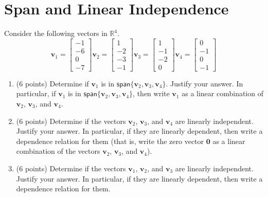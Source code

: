 \documentclass{article}
\theoremstyle{remark}
\newcommand{\vv}[1]{\mathbf{#1}}
\newcommand{\vspan}{\mathsf{span}}
\begin{document}
\section{Span and Linear Independence}
Consider the following vectors in $\mathbb R^4$.
\begin{displaymath}
  \mathbf v_1 =
  \begin{bmatrix}
    -1 \\
    -6 \\
    0 \\
    -7
  \end{bmatrix}
  \mathbf v_2 =
  \begin{bmatrix}
    1 \\
    -2 \\
    -3 \\
    -1
  \end{bmatrix}
  \mathbf v_3 =
  \begin{bmatrix}
    1 \\
    -1 \\
    -2 \\
    0
  \end{bmatrix}
  \mathbf v_4 =
  \begin{bmatrix}
    0 \\
    -1 \\
    0 \\
    -1
  \end{bmatrix}
\end{displaymath}
\begin{enumerate}
\item (6 points) Determine if $\vv v_1$ is in $\vspan\{\vv v_2, \vv v_3, \vv v_4\}$.
  Justify your answer.
  In particular, if $\vv v_1$ is in $\vspan\{\vv v_2, \vv v_3, \vv v_4\}$, then write $\vv v_1$ as a linear combination of $\vv v_2$, $\vv v_3$, and $\vv v_4$.
\item (6 points) Determine if the vectors $\vv v_2$, $\vv v_3$, and $\vv v_4$ are linearly independent.
  Justify your answer.
  In particular, if they are linearly dependent, then write a dependence relation for them (that is, write the zero vector $\vv 0$ as a linear combination of the vectors $\vv v_2$, $\vv v_3$, and $\vv v_4$).
\item (6 points) Determine if the vectors $\vv v_1$, $\vv v_2$, and $\vv v_3$ are linearly independent.
  Justify your answer.
  In particular, if they are linearly dependent, then write a dependence relation for them.
\end{enumerate}
\end{document}
